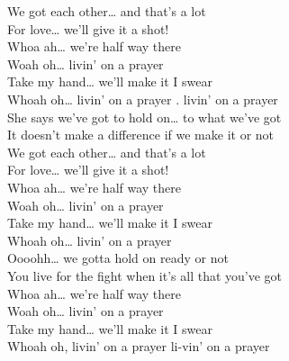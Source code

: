 We  got each  other… and that's a  lot\\
For  love… we'll  give it a shot!\\
 Whoa  ah… we're  half way there\\
 Woah  oh…  livin' on a prayer\\
 Take my  hand… we'll  make it I swear\\
 Whoah  oh…  livin' on a prayer .   livin' on a prayer\\
She says we've got to  hold  on… to what we've  got\\
It  doesn't make a  difference if we make it or  not\\
We  got each  other… and that's a  lot\\
For  love… we'll  give it a shot!\\
 Whoa ah… we're  half way there\\
 Woah  oh…  livin' on a prayer\\
 Take my  hand… we'll  make it I swear\\
 Whoah  oh…  livin' on a prayer\\
 Oooohh… we gotta  hold  on ready or  not\\
You  live for the fight when it's  all that you've got\\
 Whoa  ah… we're  half way there\\
 Woah  oh…  livin' on a prayer\\
 Take my  hand… we'll  make it I swear\\
 Whoah  oh,  livin' on a prayer  li-vin' on a prayer
